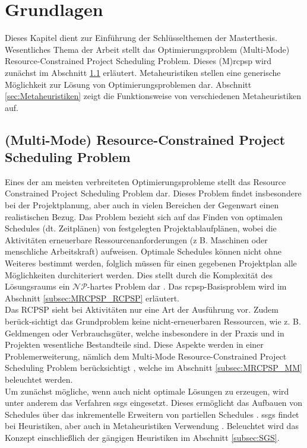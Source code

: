 \chapter{Grundlagen} \label{ch:Grundlagen}

Dieses Kapitel dient zur Einführung der Schlüsselthemen der Masterthesis. Wesentliches Thema der Arbeit stellt das Optimierungsproblem (Multi-Mode) Resource-Constrained Project Scheduling Problem. Dieses (M)\ac{rcpsp} wird zunächst im Abschnitt \ref{sec:MRCPSP} erläutert. Metaheuristiken stellen eine generische Möglichkeit zur Lösung von Optimierungsproblemen dar. Abschnitt \ref{sec:Metaheuristiken} zeigt die Funktionsweise von verschiedenen Metaheuristiken auf. 

\section{(Multi-Mode) Resource-Constrained Project Scheduling Problem} \label{sec:MRCPSP}

Eines der am meisten verbreiteten Optimierungsprobleme stellt das Resource Constrained Project Scheduling Problem dar. Dieses Problem findet insbesondere bei der Projektplanung, aber auch in vielen Bereichen der Gegenwart einen realistischen Bezug. Das Problem bezieht sich auf das Finden von optimalen Schedules (dt. Zeitplänen) von festgelegten Projektablaufplänen, wobei die Aktivitäten erneuerbare Ressourcenanforderungen (z B. Maschinen oder menschliche Arbeitskraft) aufweisen. Optimale Schedules können nicht ohne Weiteres bestimmt werden, folglich müssen für einen gegebenen Projektplan alle Möglichkeiten durchiteriert werden. Dies stellt durch die Komplexität des Lösungsraums ein $\mathcal{NP}$-hartes Problem dar \cite[vgl.][S. 2]{kolisch_heuristic_1998}. Das \ac{rcpsp}-Basisproblem wird im Abschnitt \ref{subsec:MRCPSP_RCPSP} erläutert. \\

Das RCPSP sieht bei Aktivitäten nur eine Art der Ausführung vor. Zudem berück-sichtigt das Grundproblem keine nicht-erneuerbaren Ressourcen, wie z. B. Geldmengen oder Verbrauchsgüter, welche insbesondere in der Praxis und in Projekten wesentliche Bestandteile sind. Diese Aspekte werden in einer Problemerweiterung, nämlich dem Multi-Mode Resource-Constrained Project Scheduling Problem berücksichtigt \cite[vgl.][S. 596 f.]{wuliang_improved_2014}, welche im Abschnitt \ref{subsec:MRCPSP_MM} beleuchtet werden. \\

Um zunächst mögliche, wenn auch nicht optimale Lösungen zu erzeugen, wird unter anderem das Verfahren \ac{ssgs} eingesetzt. Dieses ermöglicht das Aufbauen von Schedules über das inkrementelle Erweitern von partiellen Schedules \cite[vgl.][S. 3]{kolisch_heuristic_1998}. \ac{ssgs} findet bei Heuristiken, aber auch in Metaheuristiken Verwendung \cite[vgl.][S. 3]{kolisch_heuristic_1998}. Beleuchtet wird das Konzept einschließlich der gängigen Heuristiken im Abschnitt \ref{subsec:SGS}. \\

